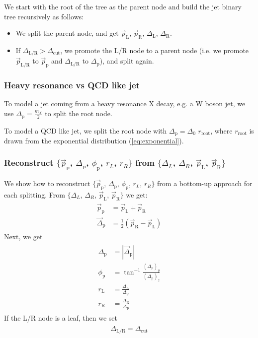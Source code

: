 \documentclass[12pt]{article}
\newcommand{\bea}{\begin{eqnarray}\begin{aligned}}
\newcommand{\eea}{\end{aligned}\end{eqnarray}}
\begin{document}
We start with the root of the tree as the parent node and build the jet binary tree recursively as follows:
\begin{itemize}

\item We split the parent node, and get $\vec{p}_\text{L}$, $\vec{p}_\text{R}$, $\Delta_\text{L}$, $\Delta_\text{R}$.

\item If $\Delta_\text{L/R} > \Delta_\text{cut}$, we promote the L/R node to a parent node (i.e. we promote $\vec{p}_\text{L/R}$ to $\vec{p}_\text{p}$ and $\Delta_\text{L/R}$ to $\Delta_\text{p}$), and split again.

\end{itemize}

\subsubsection{Heavy resonance vs QCD like jet}

To model a jet coming from a heavy resonance X decay, e.g. a W boson jet, we use $\Delta_{\text{p}} =  \frac{m_X}{2}$ to split the root node.

To model a QCD like jet, we split the root node with $\Delta_{\text{p}} = \Delta_0 \,\, r_{\text{root}}$, where $r_{\text{root}}$ is drawn from the exponential distribution (\ref{eq:exponential}).

\subsubsection{Reconstruct $\{\vec{p}_\text{p}$, $\Delta_{\text{p}}$, $\phi_{\text{p}}$, $r_L$, $r_R\}$ from  $\{\Delta_L$, $\Delta_R$, $\vec{p}_\text{L}$, $ \vec{p}_\text{R}\}$ }

We show how to reconstruct $\{\vec{p}_\text{p}$, $\Delta_{\text{p}}$, $\phi_{\text{p}}$, $r_L$, $r_R\}$ from a bottom-up approach for each splitting. From  $\{\Delta_L$, $\Delta_R$, $\vec{p}_\text{L}$, $ \vec{p}_\text{R}\}$ we get:
\bea
\vec{p}_\text{p} &= \vec{p}_\text{L}+ \vec{p}_\text{R}\\
\vec{\Delta}_\text{p} &= \frac{1}{2} (\vec{p}_\text{R} - \vec{p}_\text{L})
\eea
Next, we get
\bea
\Delta_\text{p} &= | \vec{ \Delta}_\text{p} |\\
\phi_{\text{p}} &=\tan^{-1}\frac{(\Delta_\text{p})_y}{(\Delta_\text{p})_z}\\
r_{\text{L}} &=\frac{\Delta_{\text{L}}}{\Delta_{\text{p}}}\\
r_{\text{R}} &=\frac{\Delta_{\text{R}}}{\Delta_{\text{p}}}
\eea
If the L/R node is a leaf, then we set
\bea
\Delta_{\text{L/R}}=\Delta_{\text{cut}}
\eea
\end{document}
